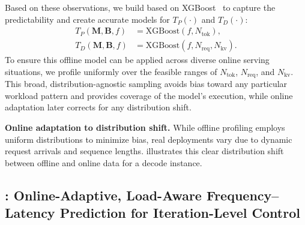 Based on these observations, we build \predictor based on XGBoost~\cite{chen2016xgboost} to capture the predictability and create accurate models for $T_P(\cdot)$ and $T_D(\cdot)$:
\begin{align}
    T_P \left(\mathbf{M}, \mathbf{B}, f \right) &= \text{XGBoost}(f, N_{\text{tok}}),\\
    T_D \left(\mathbf{M}, \mathbf{B}, f \right) &= \text{XGBoost}(f, N_{\text{req}}, N_{\text{kv}}).
\end{align}
To ensure this offline model can be applied across diverse online serving situations, we profile uniformly over the feasible ranges of $N_{\text{tok}}$, $N_{\text{req}}$, and $N_{\text{kv}}$. This broad, distribution-agnostic sampling avoids bias toward any particular workload pattern and provides coverage of the model's execution, while online adaptation later corrects for any distribution shift.

\noindent
\textbf{Online adaptation to distribution shift.} While offline profiling employs uniform distributions to minimize bias, real deployments vary due to dynamic request arrivals and sequence lengths.  illustrates this clear distribution shift between offline and online data for a decode instance.

\subsection{\predictor: Online-Adaptive, Load-Aware Frequency–Latency Prediction for Iteration-Level Control} 
\label{subsec:predictor}

